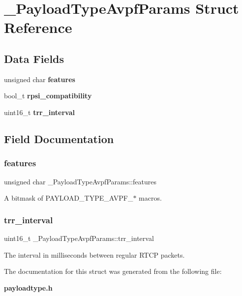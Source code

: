 \section{\+\_\+\+Payload\+Type\+Avpf\+Params Struct Reference}
\label{struct__PayloadTypeAvpfParams}
\subsection*{Data Fields}
\begin{DoxyCompactItemize}
\item 
unsigned char \textbf{ features}
\item 
\mbox{\label{struct__PayloadTypeAvpfParams_af1572df0e909b3972705750a416bfa01}} 
bool\+\_\+t {\bfseries rpsi\+\_\+compatibility}
\item 
uint16\+\_\+t \textbf{ trr\+\_\+interval}
\end{DoxyCompactItemize}


\subsection{Field Documentation}
\mbox{\label{struct__PayloadTypeAvpfParams_a4959dbe199adacec98fa942d75da0aaf}} 
\subsubsection{features}
{\footnotesize\ttfamily unsigned char \+\_\+\+Payload\+Type\+Avpf\+Params\+::features}

A bitmask of P\+A\+Y\+L\+O\+A\+D\+\_\+\+T\+Y\+P\+E\+\_\+\+A\+V\+P\+F\+\_\+$\ast$ macros. \mbox{\label{struct__PayloadTypeAvpfParams_a43083ad028c739e1d1d207e71bc9ee3a}} 
\subsubsection{trr\+\_\+interval}
{\footnotesize\ttfamily uint16\+\_\+t \+\_\+\+Payload\+Type\+Avpf\+Params\+::trr\+\_\+interval}

The interval in milliseconds between regular R\+T\+CP packets. 

The documentation for this struct was generated from the following file\+:\begin{DoxyCompactItemize}
\item 
\textbf{ payloadtype.\+h}\end{DoxyCompactItemize}
